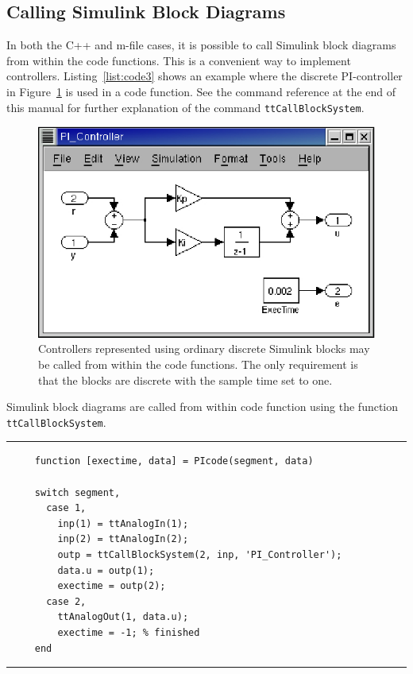 \documentclass[final,twoside]{rapport}
\begin{document}
\subsection{Calling Simulink Block Diagrams}
In both the C++ and m-file cases, it is possible to call Simulink
block diagrams from within the code functions. This is a convenient
way to implement controllers. Listing~\ref{list:code3} shows an
example where the discrete PI-controller in Figure~\ref{fig:piblock}
is used in a code function. See the command reference at the end of
this manual for further explanation of the command
\texttt{ttCallBlockSystem}.

\begin{figure}[h]
  \centerline{\includegraphics[scale=1.0]{block.ps}}
  \caption{Controllers represented using ordinary discrete
    Simulink blocks may be called from within the code functions. The
    only requirement is that the blocks are discrete with the sample
    time set to one.}
  \label{fig:piblock}
\end{figure}

\begin{listing}[b]\small
\caption{Simulink block diagrams are called from within code
  function using the function \texttt{ttCallBlockSystem}.}
\label{list:code3}
\vspace{3mm}
\hrule
\begin{verbatim}
     function [exectime, data] = PIcode(segment, data)

     switch segment,
       case 1,
         inp(1) = ttAnalogIn(1);
         inp(2) = ttAnalogIn(2);
         outp = ttCallBlockSystem(2, inp, 'PI_Controller');
         data.u = outp(1);
         exectime = outp(2);
       case 2,
         ttAnalogOut(1, data.u);
         exectime = -1; % finished
     end
\end{verbatim}
\hrule
\end{listing}
\clearpage
\end{document}
